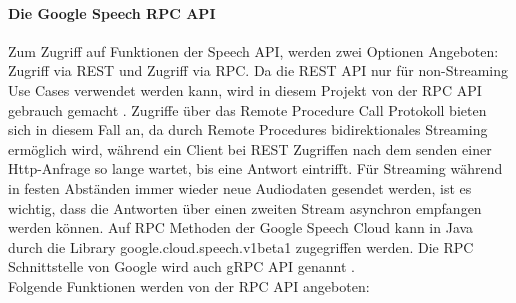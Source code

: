 \paragraph{Die Google Speech RPC API}
Zum Zugriff auf Funktionen der Speech API, werden zwei Optionen Angeboten: Zugriff via REST und Zugriff via RPC. Da die REST API nur für non-Streaming Use Cases verwendet werden kann, wird in diesem Projekt von der RPC API gebrauch gemacht \cite{google_apis_2017}. Zugriffe über das Remote Procedure Call Protokoll bieten sich in diesem Fall an, da durch Remote Procedures bidirektionales Streaming ermöglich wird, während ein Client bei REST Zugriffen nach dem senden einer Http-Anfrage so lange wartet, bis eine Antwort eintrifft. Für Streaming während in festen Abständen immer wieder neue Audiodaten gesendet werden, ist es wichtig, dass die Antworten über einen zweiten Stream asynchron empfangen werden können. Auf RPC Methoden der Google Speech Cloud kann in Java durch die Library google.cloud.speech.v1beta1 zugegriffen werden. Die RPC Schnittstelle von Google wird auch gRPC API genannt \cite{google_apis_2017}.\\
Folgende Funktionen werden von der RPC API angeboten:\\
